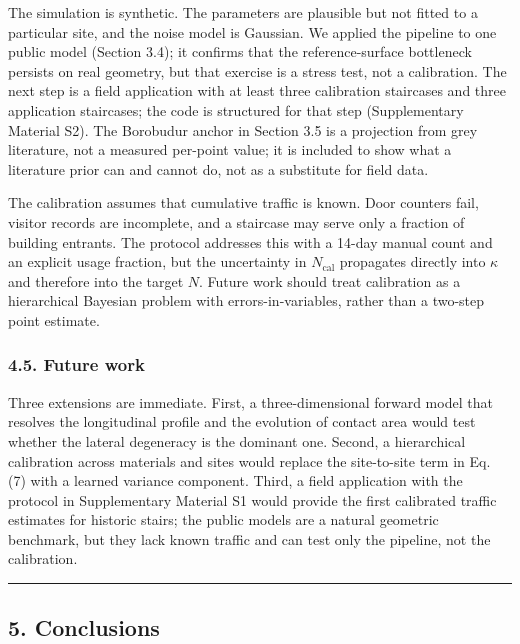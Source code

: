\documentclass[
]{article}
\begin{document}
The simulation is synthetic. The parameters are plausible but not fitted
to a particular site, and the noise model is Gaussian. We applied the
pipeline to one public model (Section 3.4); it confirms that the
reference-surface bottleneck persists on real geometry, but that
exercise is a stress test, not a calibration. The next step is a field
application with at least three calibration staircases and three
application staircases; the code is structured for that step
(Supplementary Material S2). The Borobudur anchor in Section 3.5 is a
projection from grey literature, not a measured per-point value; it is
included to show what a literature prior can and cannot do, not as a
substitute for field data.

The calibration assumes that cumulative traffic is known. Door counters
fail, visitor records are incomplete, and a staircase may serve only a
fraction of building entrants. The protocol addresses this with a 14-day
manual count and an explicit usage fraction, but the uncertainty in
\(N_{\mathrm{cal}}\) propagates directly into \(\kappa\) and therefore
into the target \(N\). Future work should treat calibration as a
hierarchical Bayesian problem with errors-in-variables, rather than a
two-step point estimate.

\subsubsection{4.5. Future work}\label{future-work}

Three extensions are immediate. First, a three-dimensional forward model
that resolves the longitudinal profile and the evolution of contact area
would test whether the lateral degeneracy is the dominant one. Second, a
hierarchical calibration across materials and sites would replace the
site-to-site term in Eq. (7) with a learned variance component. Third, a
field application with the protocol in Supplementary Material S1 would
provide the first calibrated traffic estimates for historic stairs; the
public models are a natural geometric benchmark, but they lack known
traffic and can test only the pipeline, not the calibration.

\begin{center}\rule{0.5\linewidth}{0.5pt}\end{center}

\subsection{5. Conclusions}\label{conclusions}
\end{document}
